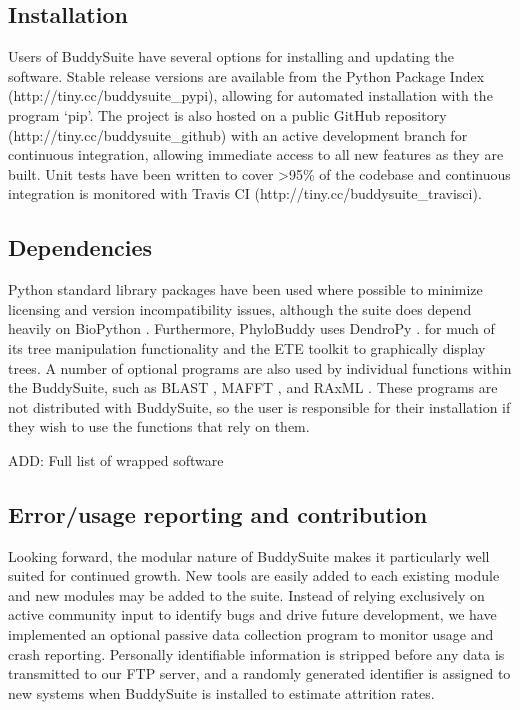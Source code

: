 \documentclass[twocolumn]{bmcart}%
\begin{document}
\subsection*{Installation}
Users of BuddySuite have several options for installing and updating the software. Stable release versions are available from the Python Package Index \cite{pypi} (http://tiny.cc/buddysuite\_pypi), allowing for automated installation with the program `pip'. The project is also hosted on a public GitHub \cite{github} repository (http://tiny.cc/buddysuite\_github) with an active development branch for continuous integration, allowing immediate access to all new features as they are built. Unit tests have been written to cover \textgreater 95\% of the codebase and continuous integration is monitored with Travis CI \cite{travisci} (http://tiny.cc/buddysuite\_travisci).

\subsection*{Dependencies}
Python standard library packages have been used where possible to minimize licensing and version incompatibility issues, although the suite does depend heavily on BioPython \cite{Cock:2009hj}. Furthermore, PhyloBuddy uses DendroPy \cite{Sukumaran:2010id}. for much of its tree manipulation functionality and the ETE toolkit \cite{HuertaCepas:2010fd} to graphically display trees. A number of optional programs are also used by individual functions within the BuddySuite, such as BLAST \cite{Camacho2009}, MAFFT \cite{Katoh:2013hm}, and RAxML \cite{Stamatakis:2006de}. These programs are not distributed with BuddySuite, so the user is responsible for their installation if they wish to use the functions that rely on them.

ADD: Full list of wrapped software


\subsection*{Error/usage reporting and contribution}
Looking forward, the modular nature of BuddySuite makes it particularly well suited for continued growth. New tools are easily added to each existing module and new modules may be added to the suite. Instead of relying exclusively on active community input to identify bugs and drive future development, we have implemented an optional passive data collection program to monitor usage and crash reporting. Personally identifiable information is stripped before any data is transmitted to our FTP server, and a randomly generated identifier is assigned to new systems when BuddySuite is installed to estimate attrition rates.
\end{document}
